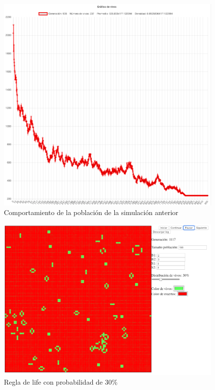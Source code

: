 	\begin{figure}[H]
		\begin{center}
			\includegraphics[scale=.24]{GOL/img/life20-2.png}
			\caption{Comportamiento de la población de la simulación anterior}
			\label{fig:gol5}
		\end{center}
	\end{figure}

	\begin{figure}[H]
		\begin{center}
			\includegraphics[scale=.3]{GOL/img/life30-1.png}
			\caption{Regla de life con probabilidad de 30\%}
			\label{fig:gol5}
		\end{center}
	\end{figure}

